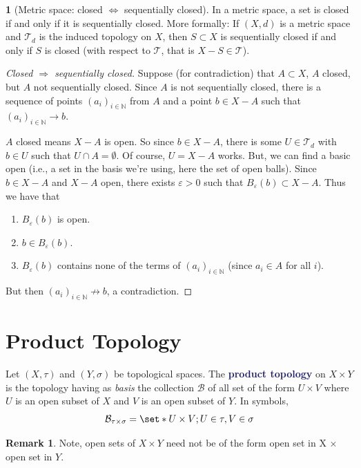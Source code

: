 \documentclass[11pt]{article}
\numberwithin{equation}{section}
\newcommand{\navy}[1]{\textcolor{MidnightBlue}{\bf #1}}
\newcounter{theo}[section]\setcounter{theo}{0}
\theoremstyle{definition}
\newtheorem{claim}{\color{ForestGreen}{\textbf{Claim}}}[section]
\theoremstyle{definition}
\newtheorem*{remark}{Remark}
\def\Set{\set*}%
\def\ss{\subset}
\def\imp{\Rightarrow}
\newcommand{\1}{\mathbbm 1}
\def\t{\tau}
\newcommand{\e}{\varepsilon}
\newcommand{\NN}{\mathbb N}
\newcommand{\tT}{\mathcal T}
\newcommand{\bB}{\mathcal B}
\begin{document}
\begin{claim}[Metric space: closed $\iff$ sequentially closed]
	In a metric space, a set is closed if and only if it is sequentially closed. More formally: If $(X,d)$ is a metric space and $\tT_d$ is the induced topology on $X$, then $S \ss X$ is sequentially closed if and only if $S$ is closed (with respect to $\tT$, that is $X-S \in \tT$). 
\end{claim}
\begin{proof}[Closed $\imp$ sequentially closed]
	Suppose (for contradiction) that $A \ss X$, $A$ closed, but $A$ not sequentially closed. Since $A$ is not sequentially closed, there is a sequence of points  $(a_i)_{i \in \NN}$ from $A$ and a point $b \in X - A$ such that $(a_i)_{i \in \NN} \to b$.  

	$A$ closed means $X- A$ is open. So since $b \in X-A$, there is some $U \in \tT_d$ with $b \in U$ such that $U \cap A = \emptyset$. Of course, $U = X - A$ works. But, we can find a basic open (i.e., a set in the basis we're using, here the set of open balls). Since $b \in X-A$ and $X-A$ open, there exists $\e> 0$ such that $B_\e(b) \ss X-A$. Thus we have that
	\begin{enumerate}
		\item $B_\e(b)$ is open.
		\item $b \in B_\e(b)$.
		\item $B_\e(b)$ contains none of the terms of  $(a_i)_{i \in \NN}$ (since $a_i \in A$ for all $i$). 
	\end{enumerate}
	But then  $(a_i)_{i \in \NN} \not\to b$, a contradiction.
\end{proof}

\section{Product Topology}
\begin{definition}
	Let $(X,\t)$ and $(Y,\sigma)$ be topological spaces. The \navy{product topology} on $X \times Y$ is the topology having as \emph{basis} the collection $\bB$ of all set of the form $U \times V$ where $U$ is an open subset of $X$ and $V$ is an open subset of $Y$. In symbols,
	\begin{equation}
		\bB_{\t \times \sigma} = \Set{U \times V; U \in \t, V \in \sigma}
	\end{equation}
\end{definition}

\begin{remark}
	Note, open sets of $X \times Y$ need not be of the form open set in X $\times$ open set in $Y$. 
\end{remark}
\end{document}
